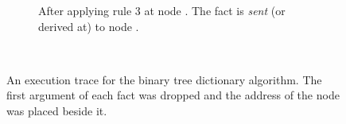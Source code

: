 \begin{figure}[h]
\begin{subfigure}[b]{0.5\textwidth}
                \caption{After applying rule 3 at node . The
                 fact is \emph{sent} (or derived at) to node
                .}

                \label{fig:implementation:scale_bp}
        \end{subfigure}\\
        \caption{An execution trace for the binary tree dictionary
           algorithm. The first argument of each fact was dropped and the
           address of the node was placed beside it.}
        \label{fig:implementation:scale1}
\end{figure}
